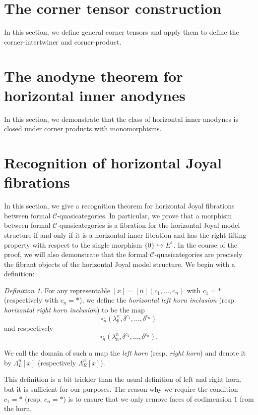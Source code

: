 \documentclass{amsart}
\numberwithin{equation}{section}
\theoremstyle{plain}   %
\theoremstyle{remark}
\newtheorem{defn}[subsection]{Definition}
\theoremstyle{plain}
\newcommand{\C}{\ensuremath{\mathcal{C}}}
\begin{document}
\appendix
\section{The corner tensor construction}\label{cornertensor} In this section, we define general corner tensors and apply them to define the corner-intertwiner and corner-product.
\section{The anodyne theorem for horizontal inner anodynes}\label{horizontal}
In this section, we demonstrate that the class of horizontal inner anodynes is closed under corner products with monomorphisms.
\section{Recognition of horizontal Joyal fibrations}\label{admissible}
In this section, we give a recognition theorem for horizontal Joyal fibrations between formal \(\C\)-quasicategories.  In particular, we prove that a morphism between formal \(\C\)-quasicategories is a fibration for the horizontal Joyal model structure if and only if it is a horizontal inner fibration and has the right lifting property with respect to the single morphism \(\{0\}\hookrightarrow E^1\). In the course of the proof, we will also demonstrate that the formal \(\C\)-quasicategories are precisely the fibrant objects of the horizontal Joyal model structure.  We begin with a definition:

\begin{defn}
	For any representable \([x]=[n](c_1,\dots,c_n)\) with \(c_1=\ast\) (respectively with \(c_n=\ast\)), we define the \emph{horizontal left horn inclusion} (resp. \emph{horizontal right horn inclusion}) to be the map \[\square^\lrcorner_n(\lambda^n_0,\delta^{c_1}, \dots, \delta^{c_n})\] and respectively \[\square^\lrcorner_n(\lambda^n_n,\delta^{c_1}, \dots, \delta^{c_n}).\]

	We call the domain of such a map the \emph{left horn} (resp. \emph{right horn}) and denote it by \(\Lambda^n_L[x]\) (respectively \(\Lambda^n_R[x]\)).
\end{defn}

This definition is a bit trickier than the usual definition of left and right horn, but it is sufficient for our purposes. The reason why we require the condition \(c_1=\ast\) (resp. \(c_n=\ast\)) is to ensure that we only remove faces of codimension \(1\) from the horn.
\end{document}
